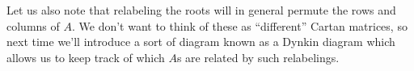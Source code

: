 Let us also note that relabeling the roots will in general permute the rows and columns of $A$. We don't want to think of these as ``different'' Cartan matrices, so next time we'll introduce a sort of diagram known as a Dynkin diagram which allows us to keep track of which $A$s are related by such relabelings.